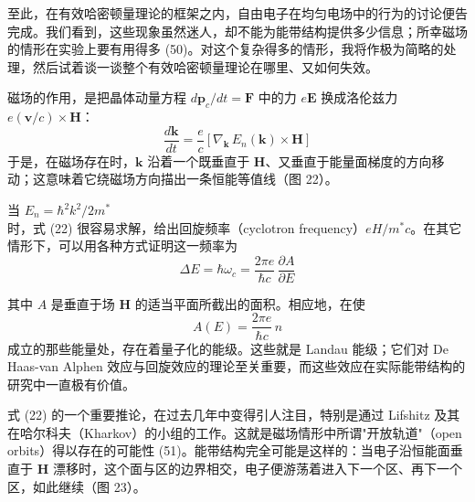 至此，在有效哈密顿量理论的框架之内，自由电子在均匀电场中的行为的讨论便告完成。我们看到，这些现象虽然迷人，却不能为能带结构提供多少信息；所幸磁场的情形在实验上要有用得多 (50)。对这个复杂得多的情形，我将作极为简略的处理，然后试着谈一谈整个有效哈密顿量理论在哪里、又如何失效。

磁场的作用，是把晶体动量方程 $d\mathbf{p}_c/dt = \mathbf{F}$ 中的力 $e\mathbf{E}$ 换成洛伦兹力 $e(\mathbf{v}/c)\times\mathbf{H}$：
\begin{equation*}
\frac{d\mathbf{k}}{dt} = \frac{e}{c}\left[\nabla_{\mathbf{k}}\,E_n(\mathbf{k})\times\mathbf{H}\right] \tag{22}
\end{equation*}
于是，在磁场存在时，$\mathbf{k}$ 沿着一个既垂直于 $\mathbf{H}$、又垂直于能量面梯度的方向移动；这意味着它绕磁场方向描出一条恒能等值线（图 22）。


当 $E_n = \hbar^2k^2/2m^*$ 时，式 (22) 很容易求解，给出回旋频率（cyclotron frequency）$eH/m^*c$。在其它情形下，可以用各种方式证明这一频率为
\begin{equation*}
\Delta E = \hbar\omega_c = \frac{2\pi e}{\hbar c}\,\frac{\partial A}{\partial E}
\end{equation*}


其中 $A$ 是垂直于场 $\mathbf{H}$ 的适当平面所截出的面积。相应地，在使
\begin{equation*}
A(E) = \frac{2\pi e}{\hbar c}\,n
\end{equation*}
成立的那些能量处，存在着量子化的能级。这些就是 Landau 能级；它们对 De Haas-van Alphen 效应与回旋效应的理论至关重要，而这些效应在实际能带结构的研究中一直极有价值。

式 (22) 的一个重要推论，在过去几年中变得引人注目，特别是通过 Lifshitz 及其在哈尔科夫（Kharkov）的小组的工作。这就是磁场情形中所谓"开放轨道"（open orbits）得以存在的可能性 (51)。能带结构完全可能是这样的：当电子沿恒能面垂直于 $\mathbf{H}$ 漂移时，这个面与区的边界相交，电子便游荡着进入下一个区、再下一个区，如此继续（图 23）。


